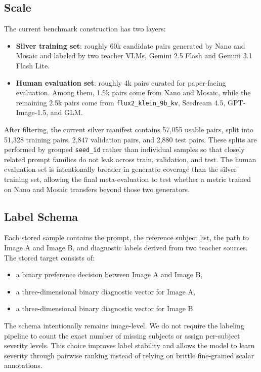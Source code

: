 \subsection{Scale}
The current benchmark construction has two layers:
\begin{itemize}
    \item \textbf{Silver training set}: roughly 60k candidate pairs generated by Nano and Mosaic and labeled by two teacher VLMs, Gemini 2.5 Flash and Gemini 3.1 Flash Lite.
    \item \textbf{Human evaluation set}: roughly 4k pairs curated for paper-facing evaluation. Among them, 1.5k pairs come from Nano and Mosaic, while the remaining 2.5k pairs come from \texttt{flux2\_klein\_9b\_kv}, Seedream 4.5, GPT-Image-1.5, and GLM.
\end{itemize}

After filtering, the current silver manifest contains 57,055 usable pairs, split into 51,328 training pairs, 2,847 validation pairs, and 2,880 test pairs. These splits are performed by grouped \texttt{seed\_id} rather than individual samples so that closely related prompt families do not leak across train, validation, and test. The human evaluation set is intentionally broader in generator coverage than the silver training set, allowing the final meta-evaluation to test whether a metric trained on Nano and Mosaic transfers beyond those two generators.

\subsection{Label Schema}
Each stored sample contains the prompt, the reference subject list, the path to Image A and Image B, and diagnostic labels derived from two teacher sources. The stored target consists of:
\begin{itemize}
    \item a binary preference decision between Image A and Image B,
    \item a three-dimensional binary diagnostic vector for Image A,
    \item a three-dimensional binary diagnostic vector for Image B.
\end{itemize}

The schema intentionally remains image-level. We do not require the labeling pipeline to count the exact number of missing subjects or assign per-subject severity levels. This choice improves label stability and allows the model to learn severity through pairwise ranking instead of relying on brittle fine-grained scalar annotations.

